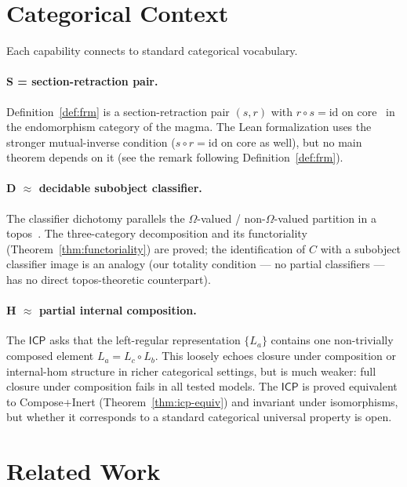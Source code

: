 \documentclass[sigconf,screen,review,anonymous]{acmart}
\newcommand{\ICP}{\textsf{ICP}}
\begin{document}
\section{Categorical Context}
\label{sec:categorical}

Each capability connects to standard categorical vocabulary.

\paragraph{S = section-retraction pair.} Definition~\ref{def:frm} is a section-retraction pair $(s, r)$ with $r \circ s = \mathrm{id}$ on core~\cite{maclane71} in the endomorphism category of the magma. The Lean formalization uses the stronger mutual-inverse condition ($s \circ r = \mathrm{id}$ on core as well), but no main theorem depends on it (see the remark following Definition~\ref{def:frm}).

\paragraph{D $\approx$ decidable subobject classifier.} The classifier dichotomy parallels the $\Omega$-valued / non-$\Omega$-valued partition in a topos~\cite{johnstone02}. The three-category decomposition and its functoriality (Theorem~\ref{thm:functoriality}) are proved; the identification of $C$ with a subobject classifier image is an analogy (our totality condition — no partial classifiers — has no direct topos-theoretic counterpart).

\paragraph{H $\approx$ partial internal composition.} The $\ICP$ asks that the left-regular representation $\{L_a\}$ contains one non-trivially composed element $L_a = L_c \circ L_b$. This loosely echoes closure under composition or internal-hom structure in richer categorical settings, but is much weaker: full closure under composition fails in all tested models. The $\ICP$ is proved equivalent to Compose+Inert (Theorem~\ref{thm:icp-equiv}) and invariant under isomorphisms, but whether it corresponds to a standard categorical universal property is open.

\section{Related Work}
\label{sec:related}
\end{document}

